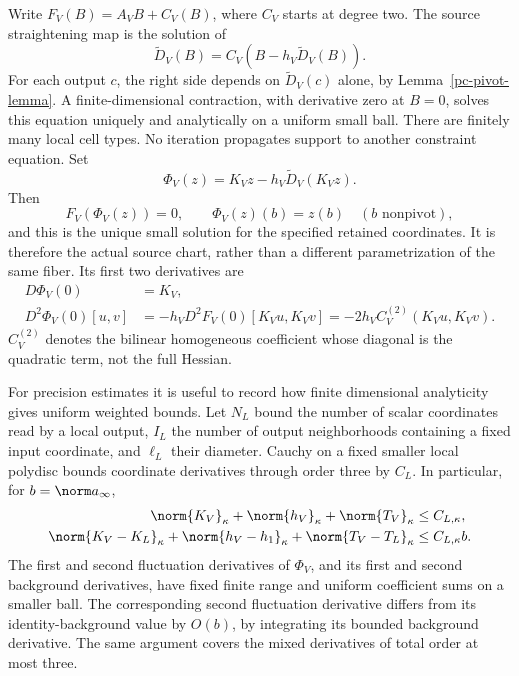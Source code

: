 Write $F_V(B)=A_VB+C_V(B)$, where $C_V$ starts at degree two.
The source straightening map is the solution of
\begin{equation}\label{pc-straightening}
 \widetilde D_V(B)=C_V(B-h_V\widetilde D_V(B)).
\end{equation}
For each output $c$, the right side depends on
$\widetilde D_V(c)$ alone, by Lemma~\ref{pc-pivot-lemma}.
A finite-dimensional contraction, with derivative zero at
$B=0$, solves this equation uniquely and analytically on a
uniform small ball. There are finitely many local cell types.
No iteration propagates support to another constraint equation.
Set
\begin{equation}\label{pc-exact-chart}
 \Phi_V(z)=K_Vz-h_V\widetilde D_V(K_Vz).
\end{equation}
Then
\begin{equation}\label{pc-chart-identities}
 F_V(\Phi_V(z))=0,\qquad
 \Phi_V(z)(b)=z(b)\quad(b\text{ nonpivot}),
\end{equation}
and this is the unique small solution for the specified retained
coordinates. It is therefore the actual source chart, rather
than a different parametrization of the same fiber. Its first
two derivatives are
\begin{equation}\label{pc-chart-derivatives}
 \begin{split}
 D\Phi_V(0)&=K_V,\\
 D^2\Phi_V(0)[u,v]
   &=-h_VD^2F_V(0)[K_Vu,K_Vv]
    =-2h_VC_V^{(2)}(K_Vu,K_Vv).
 \end{split}
\end{equation}
$C_V^{(2)}$ denotes the bilinear homogeneous coefficient whose
diagonal is the quadratic term, not the full Hessian.

For precision estimates it is useful to record how finite
dimensional analyticity gives uniform weighted bounds. Let
$N_L$ bound the number of scalar coordinates read by a local
output, $I_L$ the number of output neighborhoods containing a
fixed input coordinate, and $\ell_L$ their diameter. Cauchy on a
fixed smaller local polydisc bounds coordinate derivatives
through order three by $C_L$. In particular, for
$b=\norm a_\infty$,
\begin{equation}\label{pc-local-operators}
 \begin{split}
 \norm{K_V}_\kappa+\norm{h_V}_\kappa+\norm{T_V}_\kappa
      &\le C_{L,\kappa},\\
 \norm{K_V-K_L}_\kappa+\norm{h_V-h_1}_\kappa
       +\norm{T_V-T_L}_\kappa&\le C_{L,\kappa}b.
 \end{split}
\end{equation}
The first and second fluctuation derivatives of $\Phi_V$,
and its first and second background derivatives, have fixed
finite range and uniform coefficient sums on a smaller ball.
The corresponding second fluctuation derivative differs from
its identity-background value by $O(b)$, by integrating its
bounded background derivative. The same argument covers the
mixed derivatives of total order at most three.

